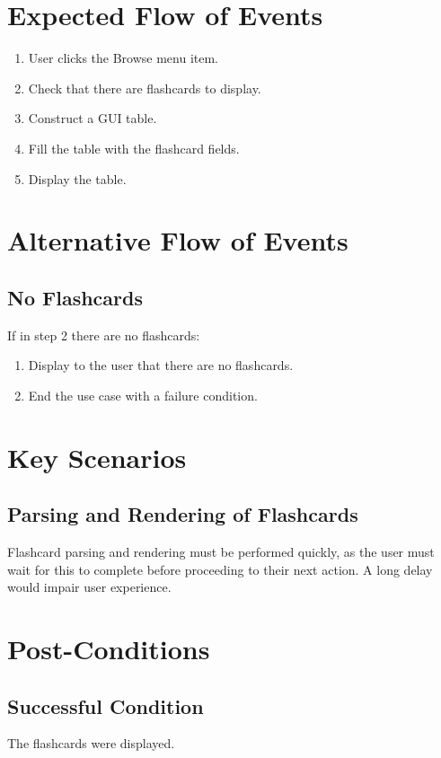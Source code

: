 \documentclass{scrreprt}
\begin{document}
\section{Expected Flow of Events}
\begin{enumerate}[1.]
    \item User clicks the Browse menu item.
    \item Check that there are flashcards to display.
    \item Construct a GUI table.
    \item Fill the table with the flashcard fields.
    \item Display the table.
\end{enumerate}

\section{Alternative Flow of Events}

    \subsection{No Flashcards}
    If in step 2 there are no flashcards:
    \begin{enumerate}
        \item Display to the user that there are no flashcards.
        \item End the use case with a failure condition.
    \end{enumerate}

\section{Key Scenarios}
    \subsection{Parsing and Rendering of Flashcards}
    Flashcard parsing and rendering must be performed quickly, as the user
    must wait for this to complete before proceeding to their next action.
    A long delay would impair user experience.

\section{Post-Conditions}
    \subsection{Successful Condition}
    The flashcards were displayed.
    
\end{document}
